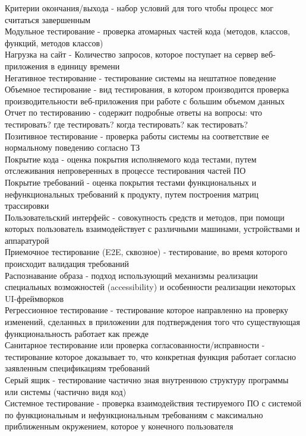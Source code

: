 \documentclass[11pt]{article}
\begin{document}
Критерии окончания/выхода - набор условий для того чтобы процесс мог считаться завершенным \\
Модульное тестирование - проверка атомарных частей кода (методов, классов, функций, методов классов) \\
Нагрузка на сайт - Количество запросов, которое поступает на сервер веб-приложения в единицу времени \\
Негативное тестирование - тестирование системы на нештатное поведение \\
Объемное тестирование - вид тестирования, в котором производится проверка производительности веб-приложения при работе с большим объемом данных \\
Отчет по тестированию - содержит подробные ответы на вопросы: что тестировать? где тестировать? когда тестировать? как тестировать? \\
Позитивное тестирование - проверка работы системы на соответствие ее нормальному поведению согласно ТЗ \\
Покрытие кода - оценка покрытия исполняемого кода тестами, путем отслеживания непроверенных в процессе тестирования частей ПО \\
Покрытие требований - оценка покрытия тестами функциональных и нефункциональных требований к продукту, путем построения матриц трассировки \\
Пользовательский интерфейс - совокупность средств и методов, при помощи которых пользователь взаимодействует с различными машинами, устройствами и аппаратурой \\
Приемочное тестирование (E2E, сквозное) - тестирование, во время которого происходит валидация требований \\
Распознавание образа - подход использующий механизмы реализации специальных возможностей (accessibility) и особенности реализации некоторых UI-фреймворков \\
Регрессионное тестирование - тестирование которое направленно на проверку изменений, сделанных в приложении для подтверждения того что существующая функциональность работает как прежде \\
Санитарное тестирование или проверка согласованности/исправности - тестирование которое доказывает то, что конкретная функция работает согласно заявленным спецификациям требований \\
Серый ящик - тестирование частично зная внутреннюю структуру программы или системы (частично видя код) \\
Системное тестирование - проверка взаимодействия тестируемого ПО с системой по функциональным и нефункциональным требованиям с максимально приближенным окружением, которое у конечного пользователя \\
\end{document}
